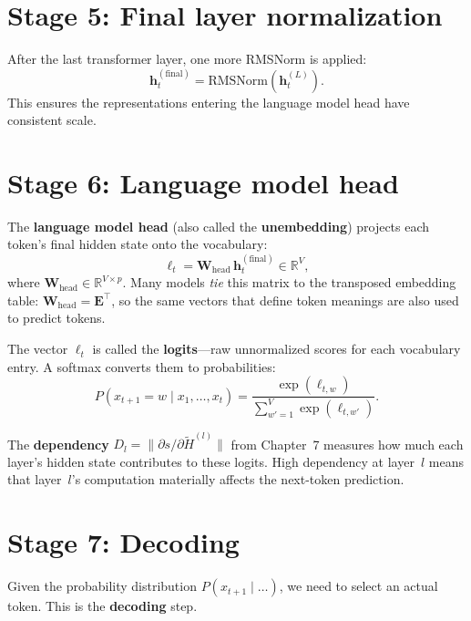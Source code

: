 \documentclass[11pt, twoside, openright]{memoir}
\begin{document}
\section{Stage 5: Final layer normalization}

After the last transformer layer, one more RMSNorm is applied:
\[
  \mathbf{h}^{(\text{final})}_t = \text{RMSNorm}(\mathbf{h}^{(L)}_t).
\]
This ensures the representations entering the language model head have
consistent scale.

\section{Stage 6: Language model head}

The \textbf{language model head} (also called the \textbf{unembedding})
projects each token's final hidden state onto the vocabulary:
\[
  \boldsymbol{\ell}_t = \mathbf{W}_{\text{head}} \, \mathbf{h}^{(\text{final})}_t
  \in \mathbb{R}^V,
\]
where $\mathbf{W}_{\text{head}} \in \mathbb{R}^{V \times p}$.  Many models
\emph{tie} this matrix to the transposed embedding table:
$\mathbf{W}_{\text{head}} = \mathbf{E}^\top$, so the same vectors that
define token meanings are also used to predict tokens.

The vector $\boldsymbol{\ell}_t$ is called the \textbf{logits}---raw
unnormalized scores for each vocabulary entry.  A softmax converts them to
probabilities:
\[
  P(x_{t+1} = w \mid x_1, \ldots, x_t) =
  \frac{\exp(\ell_{t,w})}{\sum_{w'=1}^{V} \exp(\ell_{t,w'})}.
\]

\begin{keyidea}
The \textbf{dependency} $D_l = \|\partial s / \partial \tilde{H}^{(l)}\|$
from Chapter~7 measures how much each layer's hidden state contributes to
these logits.  High dependency at layer~$l$ means that layer~$l$'s
computation materially affects the next-token prediction.
\end{keyidea}

\section{Stage 7: Decoding}

Given the probability distribution $P(x_{t+1} \mid \ldots)$, we need to
select an actual token.  This is the \textbf{decoding} step.
\end{document}
